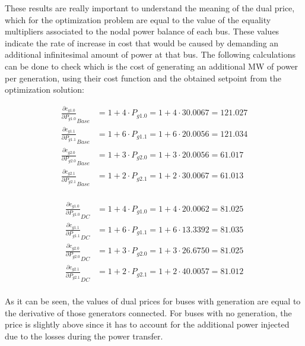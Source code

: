 These results are really important to understand the meaning of the dual price, which for the optimization problem are equal to the value of the equality multipliers associated to the nodal power balance
of each bus. These values indicate the rate of increase in cost that would be caused by demanding an additional infinitesimal amount of power at that bus. 
The following calculations can be done to check which is the cost of generating an additional MW of power per generation, using their cost function and the obtained setpoint from the optimization solution:

\begin{equation}
    \begin{split}
        \frac{\partial c_{g1.0}}{\partial P_{g1.0}}_{Base} & = 1 + 4 \cdot P_{g1.0} = 1 + 4 \cdot 30.0067 = 121.027 \\
        \frac{\partial c_{g1.1}}{\partial P_{g1.1}}_{Base} & = 1 + 6 \cdot P_{g1.1} = 1 + 6 \cdot 20.0056 = 121.034 \\
        \frac{\partial c_{g2.0}}{\partial P_{g2.0}}_{Base} & = 1 + 3 \cdot P_{g2.0} = 1 + 3 \cdot 20.0056 = 61.017 \\
        \frac{\partial c_{g2.1}}{\partial P_{g2.1}}_{Base} & = 1 + 2 \cdot P_{g2.1} = 1 + 2 \cdot 30.0067 = 61.013 \\
    \end{split}
\end{equation}

\begin{equation}
    \begin{split}
        \frac{\partial c_{g1.0}}{\partial P_{g1.0}}_{DC} & = 1 + 4 \cdot P_{g1.0} = 1 + 4 \cdot 20.0062 = 81.025 \\
        \frac{\partial c_{g1.1}}{\partial P_{g1.1}}_{DC} & = 1 + 6 \cdot P_{g1.1} = 1 + 6 \cdot 13.3392 = 81.035 \\
        \frac{\partial c_{g2.0}}{\partial P_{g2.0}}_{DC} & = 1 + 3 \cdot P_{g2.0} = 1 + 3 \cdot 26.6750 = 81.025 \\
        \frac{\partial c_{g2.1}}{\partial P_{g2.1}}_{DC} & = 1 + 2 \cdot P_{g2.1} = 1 + 2 \cdot 40.0057 = 81.012 \\
    \end{split}
\end{equation}

As it can be seen, the values of dual prices for buses with generation are equal to the derivative of those generators connected. For buses with no generation, the price is slightly above since it has to 
account for the additional power injected due to the losses during the power transfer.

